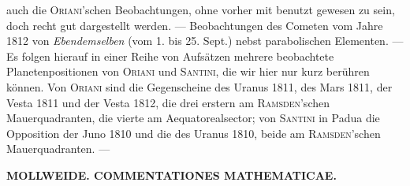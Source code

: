 auch die \textsc{Oriani}'schen Beobachtungen, ohne vorher mit benutzt gewesen zu sein, doch recht gut dargestellt werden. --- Beobachtungen des Cometen vom Jahre 1812 von \emph{Ebendemselben} (vom 1. bis 25. Sept.) nebst parabolischen Elementen. --- Es folgen hierauf in einer Reihe von Aufsätzen mehrere beobachtete Planetenpositionen von \textsc{Oriani} und \textsc{Santini}, die wir hier nur kurz berühren können. Von \textsc{Oriani} sind die Gegenscheine des Uranus 1811, des Mars 1811, der Vesta 1811 und der Vesta 1812, die drei erstern am \textsc{Ramsden}'schen Mauerquadranten, die vierte am Aequatorealsector; von \textsc{Santini} in Padua die Opposition der Juno 1810 und die des Uranus 1810, beide am \textsc{Ramsden}'schen Mauerquadranten. --- \par
\clearpage
\endgroup
\begingroup
\pagestyle{empty}
\thispagestyle{empty}
\noindent\makebox[10mm][l]{}%
\parbox[b]{\dimexpr\textwidth-20mm\relax}{\centering\small\textbf{MOLLWEIDE. COMMENTATIONES MATHEMATICAE.}}%
\par\nobreak\medskip
